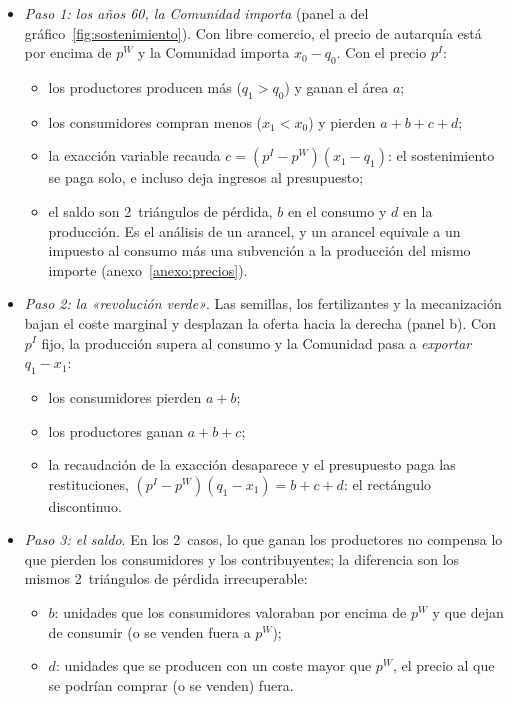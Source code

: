 \documentclass[11pt]{article}
\begin{document}
\begin{itemize}
\item \emph{Paso 1: los años 60, la Comunidad importa} (panel a del gráfico~\ref{fig:sostenimiento}). Con libre comercio, el precio de autarquía está por encima de $p^W$ y la Comunidad importa $x_0-q_0$. Con el precio $p^I$:
  \begin{itemize}
  \item los productores producen más ($q_1>q_0$) y ganan el área $a$;
  \item los consumidores compran menos ($x_1<x_0$) y pierden $a+b+c+d$;
  \item la exacción variable recauda $c=(p^I-p^W)(x_1-q_1)$: el sostenimiento se paga solo, e incluso deja ingresos al presupuesto;
  \item el saldo son 2~triángulos de pérdida, $b$ en el consumo y $d$ en la producción. Es el análisis de un arancel, y un arancel equivale a un impuesto al consumo más una subvención a la producción del mismo importe (anexo~\ref{anexo:precios}).
  \end{itemize}
\item \emph{Paso 2: la «revolución verde»}. Las semillas, los fertilizantes y la mecanización bajan el coste marginal y desplazan la oferta hacia la derecha (panel b). Con $p^I$ fijo, la producción supera al consumo y la Comunidad pasa a \emph{exportar} $q_1-x_1$:
  \begin{itemize}
  \item los consumidores pierden $a+b$;
  \item los productores ganan $a+b+c$;
  \item la recaudación de la exacción desaparece y el presupuesto paga las restituciones, $(p^I-p^W)(q_1-x_1)=b+c+d$: el rectángulo discontinuo.
  \end{itemize}
\item \emph{Paso 3: el saldo}. En los 2~casos, lo que ganan los productores no compensa lo que pierden los consumidores y los contribuyentes; la diferencia son los mismos 2~triángulos de pérdida irrecuperable:
  \begin{itemize}
  \item $b$: unidades que los consumidores valoraban por encima de $p^W$ y que dejan de consumir (o se venden fuera a $p^W$);
  \item $d$: unidades que se producen con un coste mayor que $p^W$, el precio al que se podrían comprar (o se venden) fuera.
  \end{itemize}
\end{itemize}
\end{document}
